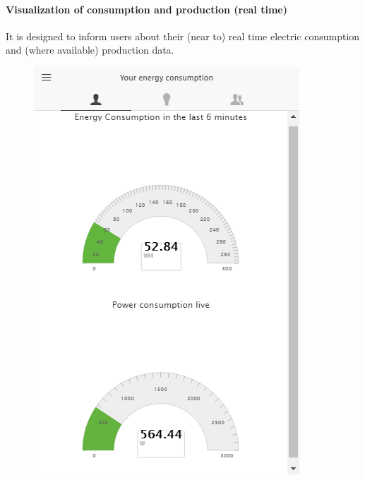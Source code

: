 \paragraph{Visualization of consumption and production (real time)} 
It is designed to inform users about their (near to) real time electric consumption and (where available) production data.
\begin{figure}[htb]
      \begin{center}
        \begin{minipage}[htb]{0.45\linewidth}    
         \includegraphics[width=1\linewidth]{img/visual_consumption.png}  
        \end{minipage}
        \begin{minipage}[htb]{0.45\linewidth}    

\end{minipage}
\end{center}
\end{figure}
